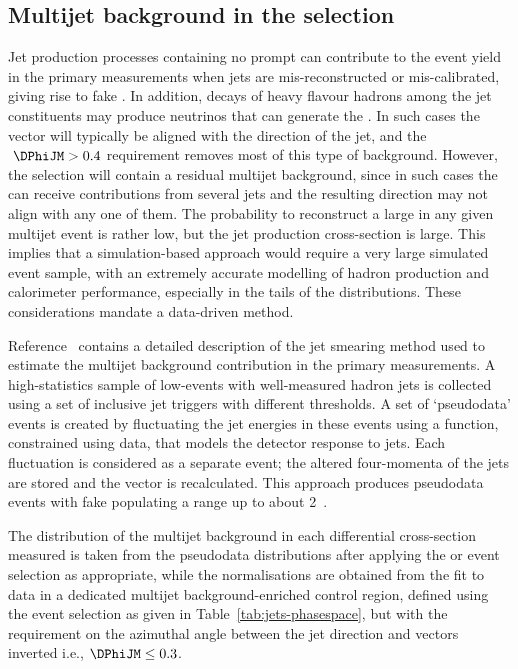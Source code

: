 \documentclass[atlasdraft=false, cernpreprint, UKenglish, texmf, orcidlogo]{atlasdoc}
\begin{document}
\subsection{Multijet background in the \ptmissjets selection}
\label{sec:multijet}
 
Jet production processes containing no prompt \ptmiss can contribute to the event yield in the primary measurements
when jets are mis-reconstructed or mis-calibrated, giving rise to fake \ptmiss.
In addition, decays of heavy flavour hadrons among the jet constituents may produce neutrinos that can generate the \ptmiss.
In such cases the \ptmiss vector will typically be aligned with the direction of the jet, and the \(\ \DPhiJM>0.4\) requirement removes most of this type of
background. However, the \ptmissjets selection will contain a residual multijet background, since in such cases the \ptmiss can receive contributions from
several jets and the resulting \ptmiss direction may not align with any one of them.
The probability to reconstruct a large \ptmiss in any given multijet event is rather low,  but the jet production cross-section is large. This implies that
a simulation-based approach would require a very large simulated event sample, with an extremely accurate modelling of hadron production and calorimeter performance,
especially in the tails of the distributions. These considerations mandate a data-driven method.
 
Reference~\cite{SUSY-2011-20} contains a detailed description of the jet smearing method used to estimate the multijet background contribution in the primary measurements.
A high-statistics sample of low-\ptmiss events with well-measured hadron jets is collected using a set of inclusive jet triggers with different \ptjet thresholds.
A set of `pseudodata' events  is created by fluctuating the jet energies in these events using a function, constrained using data,
that models the detector response to jets. Each fluctuation is considered as a separate event;
the altered four-momenta of the jets are stored and the \ptmiss vector is recalculated.
This approach produces pseudodata events with fake \ptmiss populating a range up to about 2~\TeV.
 
The distribution of the multijet background in each differential cross-section measured is taken from the pseudodata distributions after
applying the \onejet or \vbf event selection as appropriate,
while the normalisations are obtained from the fit to data in a dedicated multijet background-enriched control region, defined using the \ptmissjets event selection
as given in Table~\ref{tab:jets-phasespace}, but with the requirement on the azimuthal angle between the jet direction and \ptmiss vectors inverted i.e., \(\DPhiJM\leq 0.3\).
 
\end{document}
